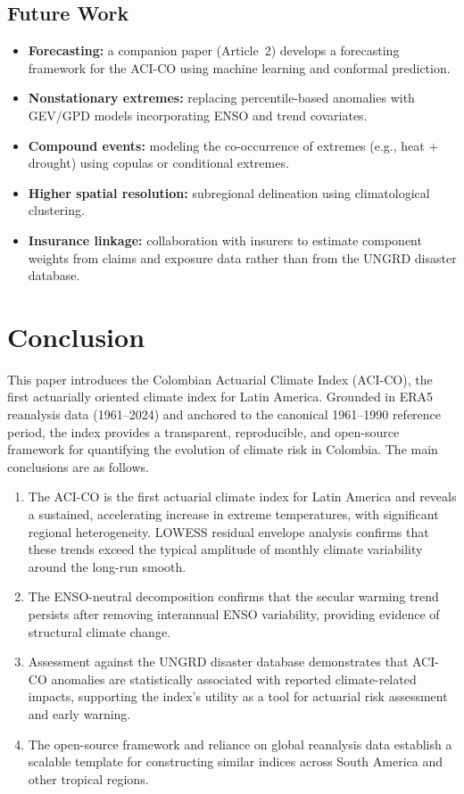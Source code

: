 \documentclass[12pt]{article}
\begin{document}
\subsection{Future Work}
 
\begin{itemize}
\item \textbf{Forecasting:} a companion paper (Article~2) develops a forecasting framework for the ACI-CO using machine learning and conformal prediction.
\item \textbf{Nonstationary extremes:} replacing percentile-based anomalies with GEV/GPD models incorporating ENSO and trend covariates.
\item \textbf{Compound events:} modeling the co-occurrence of extremes (e.g., heat + drought) using copulas or conditional extremes.
\item \textbf{Higher spatial resolution:} subregional delineation using climatological clustering.
\item \textbf{Insurance linkage:} collaboration with insurers to estimate component weights from claims and exposure data rather than from the UNGRD disaster database.
\end{itemize}
 
\section{Conclusion}\label{sec:conclusion}
 
This paper introduces the Colombian Actuarial Climate Index (ACI-CO), the first
actuarially oriented climate index for Latin America.
Grounded in ERA5 reanalysis data (1961--2024) and anchored to the canonical
1961--1990 reference period, the index provides a transparent, reproducible,
and open-source framework for quantifying the evolution of climate risk in
Colombia. The main conclusions are as follows.
 
\begin{enumerate}
\item The ACI-CO is the first actuarial climate index for Latin America and reveals a sustained, accelerating increase in extreme temperatures, with significant regional heterogeneity. LOWESS residual envelope analysis confirms that these trends exceed the typical amplitude of monthly climate variability around the long-run smooth.
\item The ENSO-neutral decomposition confirms that the secular warming trend persists after removing interannual ENSO variability, providing evidence of structural climate change.
\item Assessment against the UNGRD disaster database demonstrates that ACI-CO anomalies are statistically associated with reported climate-related impacts, supporting the index's utility as a tool for actuarial risk assessment and early warning.
\item The open-source framework and reliance on global reanalysis data establish a scalable template for constructing similar indices across South America and other tropical regions.
\end{enumerate}
 
\end{document}
